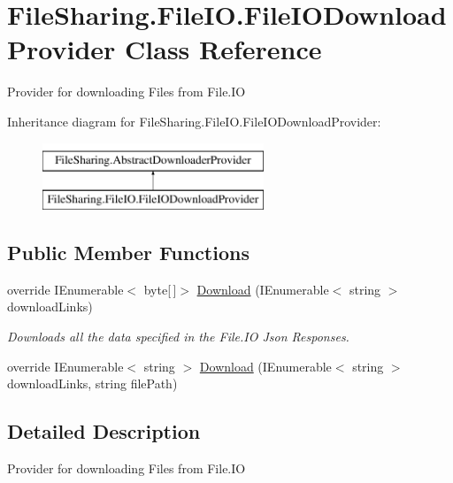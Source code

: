 \hypertarget{class_file_sharing_1_1_file_i_o_1_1_file_i_o_download_provider}{}\section{File\+Sharing.\+File\+I\+O.\+File\+I\+O\+Download\+Provider Class Reference}
\label{class_file_sharing_1_1_file_i_o_1_1_file_i_o_download_provider}


Provider for downloading Files from File.\+IO  


Inheritance diagram for File\+Sharing.\+File\+I\+O.\+File\+I\+O\+Download\+Provider\+:\begin{figure}[H]
\begin{center}
\leavevmode
\includegraphics[height=2.000000cm]{class_file_sharing_1_1_file_i_o_1_1_file_i_o_download_provider}
\end{center}
\end{figure}
\subsection*{Public Member Functions}
\begin{DoxyCompactItemize}
\item 
override I\+Enumerable$<$ byte\mbox{[}$\,$\mbox{]}$>$ \hyperlink{class_file_sharing_1_1_file_i_o_1_1_file_i_o_download_provider_a0ff0bb3a458f9caa2daa5dc035b07c11}{Download} (I\+Enumerable$<$ string $>$ download\+Links)
\begin{DoxyCompactList}\small\item\em Downloads all the data specified in the File.\+IO Json Responses. \end{DoxyCompactList}\item 
override I\+Enumerable$<$ string $>$ \hyperlink{class_file_sharing_1_1_file_i_o_1_1_file_i_o_download_provider_a8852368c5ed43e3f30def0df9f11841c}{Download} (I\+Enumerable$<$ string $>$ download\+Links, string file\+Path)
\end{DoxyCompactItemize}


\subsection{Detailed Description}
Provider for downloading Files from File.\+IO 



